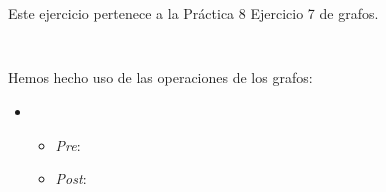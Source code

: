 \textbf{}\textit{}

\begin{quoting}
  Este ejercicio pertenece a la Práctica 8 Ejercicio 7 de grafos.
\end{quoting}

\begin{verbatim}
  
\end{verbatim}


Hemos hecho uso de las operaciones de los grafos:
\begin{itemize}
  \item \verb | |
  \begin{itemize}
    \item \textit{Pre}:
    \item \textit{Post}:
  \end{itemize}
\end{itemize}